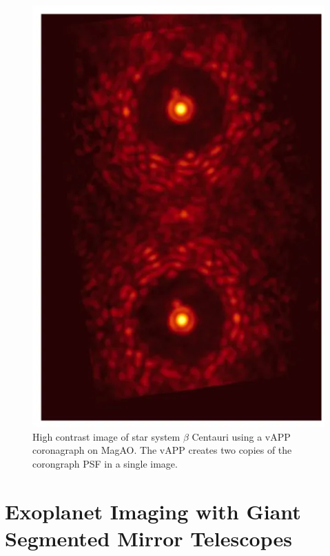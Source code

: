 \begin{figure}
    \centering
    \includegraphics{Chapter Materials/Introduction Materials/BetaCen.png}
    \caption{High contrast image of star system $\beta$ Centauri using a vAPP coronagraph on MagAO. The vAPP creates two copies of the corongraph PSF in a single image. }
    \label{fig:BetaCen}
\end{figure}



\section{Exoplanet Imaging with Giant Segmented Mirror Telescopes}

